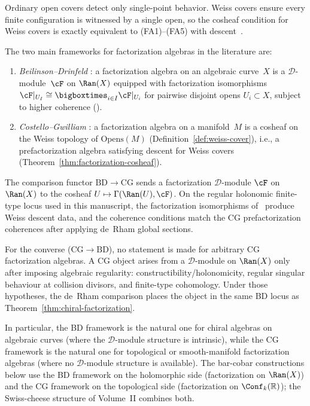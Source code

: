 \begin{remark}\label{rem:why-weiss}
Ordinary open covers detect only single-point behavior. Weiss covers ensure every finite configuration is witnessed by a single open, so the cosheaf condition for Weiss covers is exactly equivalent to (FA1)--(FA5) with descent~\cite[Proposition~6.3.4]{CG17}.
\end{remark}

\begin{remark}
\label{rem:bd-cg-comparison}
The two main frameworks for factorization algebras in the literature
are:
\begin{enumerate}[label=\textup{(\roman*)}]
\item \emph{Beilinson--Drinfeld} \cite{BD04}: a factorization algebra
 on an algebraic curve~$X$ is a $\mathcal{D}$-module~$\cF$ on
 $\Ran(X)$ equipped with factorization isomorphisms
 $\cF|_{U_I} \cong \bigboxtimes_{i \in I} \cF|_{U_i}$
 for pairwise disjoint opens $U_i \subset X$, subject to higher
 coherence (\cite[\S3.4]{BD04}).
\item \emph{Costello--Gwilliam} \cite{CG17}: a factorization algebra
 on a manifold~$M$ is a cosheaf on the Weiss topology of
 $\mathrm{Opens}(M)$ (Definition~\ref{def:weiss-cover}), i.e., a
 prefactorization algebra satisfying descent for Weiss covers
 (Theorem~\ref{thm:factorization-cosheaf}).
\end{enumerate}
The comparison functor $\mathrm{BD} \to \mathrm{CG}$ sends a factorization
$\mathcal{D}$-module $\cF$ on $\Ran(X)$ to the cosheaf
$U \mapsto \Gamma(\Ran(U), \cF)$. On the regular holonomic
finite-type locus used in this manuscript, the factorization
isomorphisms of~\cite[\S3.4]{BD04} produce Weiss descent data,
and the coherence conditions match the CG prefactorization
coherences after applying de~Rham global sections.

For the converse ($\mathrm{CG} \to \mathrm{BD}$), no statement is
made for arbitrary CG factorization algebras. A CG object arises
from a $\mathcal{D}$-module on $\Ran(X)$ only after imposing
algebraic regularity: constructibility/holonomicity, regular
singular behaviour at collision divisors, and finite-type
cohomology. Under those hypotheses, the de~Rham comparison places
the object in the same BD locus as
Theorem~\ref{thm:chiral-factorization}.

In particular, the BD framework is the natural one for chiral
algebras on algebraic curves (where the $\mathcal{D}$-module
structure is intrinsic), while the CG framework is the natural one for
topological or smooth-manifold factorization algebras (where no
$\mathcal{D}$-module structure is available). The bar-cobar
constructions below use the BD framework on the holomorphic side
(factorization on $\Ran(X)$) and the CG framework on the topological
side (factorization on $\Conf_k(\mathbb{R})$); the Swiss-cheese
structure of Volume~II combines both.
\end{remark}


